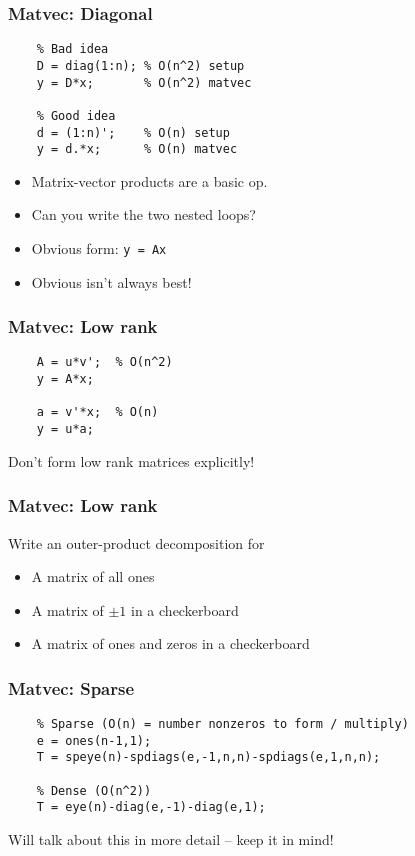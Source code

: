 \documentclass{beamer}
\begin{document}
\begin{frame}[fragile]
  \frametitle{Matvec: Diagonal}

  \begin{lstlisting}
    % Bad idea
    D = diag(1:n); % O(n^2) setup
    y = D*x;       % O(n^2) matvec

    % Good idea
    d = (1:n)';    % O(n) setup
    y = d.*x;      % O(n) matvec
  \end{lstlisting}

  \vspace{5mm}
  \begin{itemize}
  \item Matrix-vector products are a basic op.
  \item Can you write the two nested loops?
  \item Obvious form: {\tt y = Ax}
  \item Obvious isn't always best!
  \end{itemize}

\end{frame}

\begin{frame}[fragile]
  \frametitle{Matvec: Low rank}

  \begin{lstlisting}
    A = u*v';  % O(n^2)
    y = A*x;

    a = v'*x;  % O(n)
    y = u*a;
  \end{lstlisting}

  \vspace{5mm}
  Don't form low rank matrices explicitly!
\end{frame}

\begin{frame}
  \frametitle{Matvec: Low rank}

  Write an outer-product decomposition for
  \begin{itemize}
  \item A matrix of all ones
  \item A matrix of $\pm 1$ in a checkerboard
  \item A matrix of ones and zeros in a checkerboard
  \end{itemize}
\end{frame}

\begin{frame}[fragile]
  \frametitle{Matvec: Sparse}

  \begin{lstlisting}
    % Sparse (O(n) = number nonzeros to form / multiply)
    e = ones(n-1,1);
    T = speye(n)-spdiags(e,-1,n,n)-spdiags(e,1,n,n);

    % Dense (O(n^2))
    T = eye(n)-diag(e,-1)-diag(e,1);
  \end{lstlisting}
  Will talk about this in more detail -- keep it in mind!
\end{frame}
\end{document}
